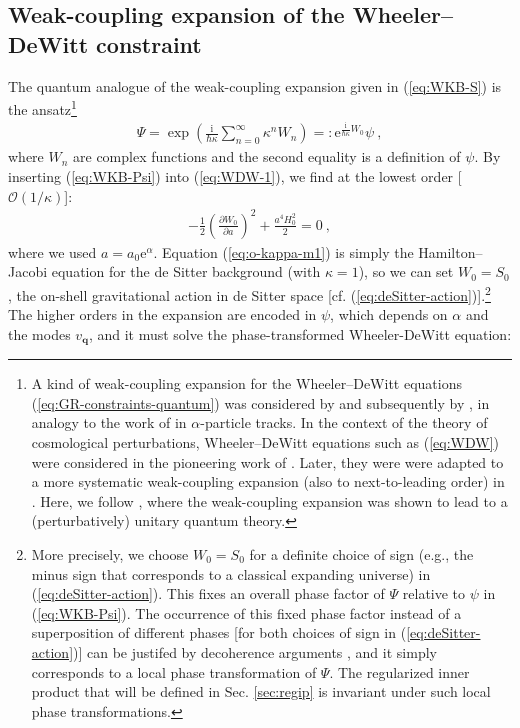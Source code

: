 \documentclass[12pt]{iopart}
\def\eq#1{\begin{equation}\begin{aligned}#1\end{aligned}\end{equation}}
\def\eref#1{(\ref{eq:#1})}
\def\e{\mathrm{e}}
\def\I{\mathrm{i}}
\def\del#1#2{\frac{\partial#1}{\partial#2}}
\def\Ob{\mathcal{O}}
\def\q{\mathbf{q}}
\begin{document}
\subsection{\label{sec:weak-WDW}Weak-coupling expansion of the Wheeler--DeWitt constraint}
The quantum analogue of the weak-coupling expansion given in \eref{WKB-S} is the ansatz\footnote{A kind of weak-coupling expansion for the Wheeler--DeWitt equations \eref{GR-constraints-quantum} was considered by \citet{Lapchinsky:1979fd} and subsequently by \citet{BANKS1985332}, in analogy to the work of \citet{Mott1,Mott2} in $\alpha$-particle tracks. In the context of the theory of cosmological perturbations, Wheeler--DeWitt equations such as \eref{WDW} were considered in the pioneering work of \citet{HalliwellHawking}. Later, they were were adapted to a more systematic weak-coupling expansion (also to next-to-leading order) in \citet{Kiefer:2011cc,Bini:2013fea,Brizuela:2015tzl,Brizuela:2016gnz}. Here, we follow \citet{Chataignier:2020fap,Chataignier:2022iwb}, where the weak-coupling expansion was shown to lead to a (perturbatively) unitary quantum theory.}
\eq{\label{eq:WKB-Psi}
\Psi = \exp\left(\frac{\I}{\hbar\kappa}\sum_{n=0}^{\infty}\kappa^n W_n\right) =: \e^{\frac{\I}{\hbar\kappa}W_0}\psi \ ,
}
where $W_n$ are complex functions and the second equality is a definition of $\psi$. By inserting \eref{WKB-Psi} into \eref{WDW-1}, we find at the lowest order [$\Ob(1/\kappa)$]:
\eq{\label{eq:o-kappa-m1}
-\frac{1}{2}\left(\del{W_0}{a}\right)^2+\frac{a^4 H_0^2}{2} = 0 \ ,
}
where we used $a = a_0 \e^{\alpha}$. Equation \eref{o-kappa-m1} is simply the Hamilton--Jacobi equation for the de Sitter background (with $\kappa=1$), so we can set $W_0=S_0$, the on-shell gravitational action in de Sitter space [cf. \eref{deSitter-action}].\footnote{More precisely, we choose $W_0 = S_0$ for a definite choice of sign (e.g., the minus sign that corresponds to a classical expanding universe) in \eref{deSitter-action}. This fixes an overall phase factor of $\Psi$ relative to $\psi$ in \eref{WKB-Psi}. The occurrence of this fixed phase factor instead of a superposition of different phases [for both choices of sign in \eref{deSitter-action}] can be justifed by decoherence arguments \citep{Halliwell:1989vw,Kiefer:1992cn,Kiefer:1993yg}, and it simply corresponds to a local phase transformation of $\Psi$. The regularized inner product that will be defined in Sec. \ref{sec:regip} is invariant under such local phase transformations.} The higher orders in the expansion are encoded in $\psi$, which depends on $\alpha$ and the modes $v_{\q}$, and it must solve the phase-transformed Wheeler-DeWitt equation:
\end{document}
